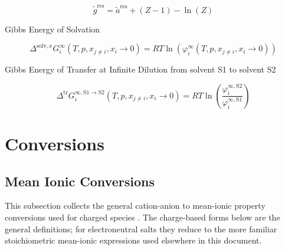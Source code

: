 \documentclass[12pt, letterpaper]{article}
\begin{document}
\begin{equation}
    \tilde{g}^{\mathrm{res}}=\tilde{a}^{\mathrm{res}}+(Z-1)-\ln(Z)
    \label{eq:g_res_from_ares}
\end{equation}

Gibbs Energy of Solvation


\begin{equation}
    \Delta^{\mathrm{solv},x}G_{i}^{\infty}(T,p,x_{j\neq i},x_{i}\to0)=RT\ln(\varphi_{i}^{\infty}(T,p,x_{j\neq i},x_{i}\to0))
    \label{eq:delta_g_solv_inf_x}
\end{equation}

Gibbs Energy of Transfer at Infinite Dilution from solvent S1 to solvent S2

\begin{equation}
    \Delta^{\mathrm{tr}}G_{i}^{\infty,\mathrm{S}1\to\mathrm{S}2}(T,p,x_{j\neq i},x_{i}\rightarrow0)=RT\ln\left(\frac{\varphi_{i}^{\infty,\mathrm{S}2}}{\varphi_{i}^{\infty,\mathrm{S}1}}\right)
    \label{eq:delta_g_transfer_inf}
\end{equation}

\section{Conversions}

\subsection{Mean Ionic Conversions}

This subsection collects the general cation-anion to mean-ionic property conversions used for charged species \cite{Ascani2022}. The charge-based forms below are the general definitions; for electroneutral salts they reduce to the more familiar stoichiometric mean-ionic expressions used elsewhere in this document.

\end{document}
